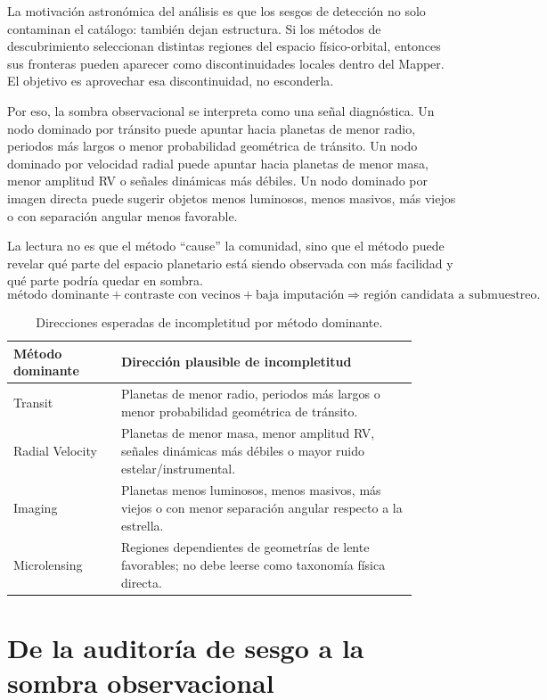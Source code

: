 \documentclass[11pt]{article}
\begin{document}
La motivación astronómica del análisis es que los sesgos de detección no solo contaminan el catálogo: también dejan estructura. Si los métodos de descubrimiento seleccionan distintas regiones del espacio físico-orbital, entonces sus fronteras pueden aparecer como discontinuidades locales dentro del Mapper. El objetivo es aprovechar esa discontinuidad, no esconderla.

Por eso, la sombra observacional se interpreta como una señal diagnóstica. Un nodo dominado por tránsito puede apuntar hacia planetas de menor radio, periodos más largos o menor probabilidad geométrica de tránsito. Un nodo dominado por velocidad radial puede apuntar hacia planetas de menor masa, menor amplitud RV o señales dinámicas más débiles. Un nodo dominado por imagen directa puede sugerir objetos menos luminosos, menos masivos, más viejos o con separación angular menos favorable.

La lectura no es que el método “cause” la comunidad, sino que el método puede revelar qué parte del espacio planetario está siendo observada con más facilidad y qué parte podría quedar en sombra.
\[
\text{método dominante} + \text{contraste con vecinos} + \text{baja imputación}
\Rightarrow
\text{región candidata a submuestreo}.
\]

\begin{table}[H]
\centering
\small
\caption{Direcciones esperadas de incompletitud por método dominante.}
\label{tab:direcciones}
\begin{tabular}{p{0.24\linewidth}p{0.66\linewidth}}
\toprule
\textbf{Método dominante} & \textbf{Dirección plausible de incompletitud} \\
\midrule
Transit & Planetas de menor radio, periodos más largos o menor probabilidad geométrica de tránsito. \\
Radial Velocity & Planetas de menor masa, menor amplitud RV, señales dinámicas más débiles o mayor ruido estelar/instrumental. \\
Imaging & Planetas menos luminosos, menos masivos, más viejos o con menor separación angular respecto a la estrella. \\
Microlensing & Regiones dependientes de geometrías de lente favorables; no debe leerse como taxonomía física directa. \\
\bottomrule
\end{tabular}
\end{table}

\section{De la auditoría de sesgo a la sombra observacional}
\end{document}
